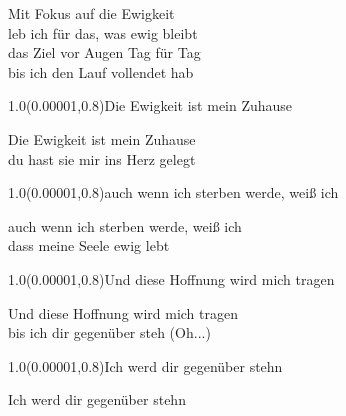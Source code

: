 \documentclass[aspectratio=169]{beamer}
\begin{document}
\begin{frame}
\centering
\color{white}
\huge{Mit Fokus auf die Ewigkeit} \\
\huge{leb ich für das, was ewig bleibt} \\
\huge{das Ziel vor Augen Tag für Tag} \\
\huge{bis ich den Lauf vollendet hab} \\

\begin{textblock}{1.0}(0.00001,0.8)\color{gray}\normalsize{Die Ewigkeit ist mein Zuhause}\end{textblock}
\end{frame}

\begin{frame}
\centering
\color{white}
\huge{Die Ewigkeit ist mein Zuhause} \\
\huge{du hast sie mir ins Herz gelegt} \\

\begin{textblock}{1.0}(0.00001,0.8)\color{gray}\normalsize{auch wenn ich sterben werde, weiß ich}\end{textblock}
\end{frame}

\begin{frame}
\centering
\color{white}
\huge{auch wenn ich sterben werde, weiß ich} \\
\huge{dass meine Seele ewig lebt} \\

\begin{textblock}{1.0}(0.00001,0.8)\color{gray}\normalsize{Und diese Hoffnung wird mich tragen}\end{textblock}
\end{frame}

\begin{frame}
\centering
\color{white}
\huge{Und diese Hoffnung wird mich tragen} \\
\huge{bis ich dir gegenüber steh (Oh...)} \\

\begin{textblock}{1.0}(0.00001,0.8)\color{gray}\normalsize{Ich werd dir gegenüber stehn}\end{textblock}
\end{frame}

\begin{frame}
\centering
\color{white}
\huge{Ich werd dir gegenüber stehn} \\
\end{frame}
\end{document}
